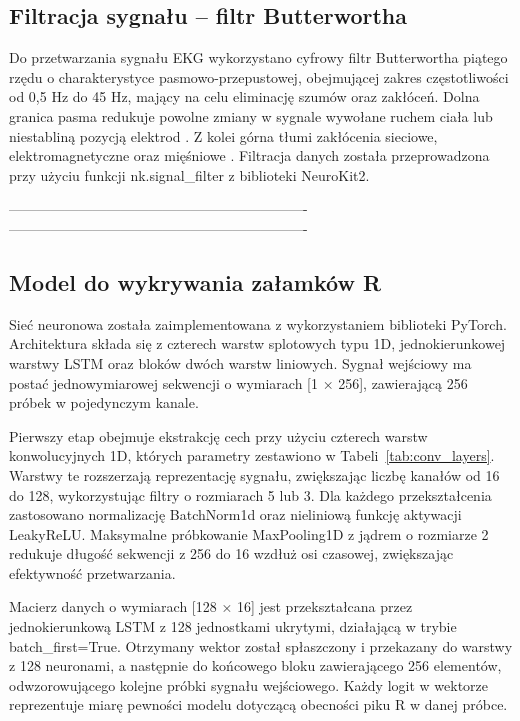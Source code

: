 \documentclass[journal]{IEEEtran}
\begin{document}
\subsection{Filtracja sygnału – filtr Butterwortha}
Do przetwarzania sygnału EKG wykorzystano cyfrowy filtr Butterwortha piątego rzędu o charakterystyce pasmowo-przepustowej, obejmującej zakres częstotliwości od 0,5 Hz do 45 Hz, mający na celu eliminację szumów oraz zakłóceń. Dolna granica pasma redukuje powolne zmiany w sygnale wywołane ruchem ciała lub niestabliną pozycją elektrod  \cite{4}. Z kolei górna tłumi zakłócenia sieciowe, elektromagnetyczne oraz mięśniowe  \cite{5}. Filtracja danych została przeprowadzona przy użyciu funkcji nk.signal\_filter z biblioteki NeuroKit2.


----------------------------------------------------------------
----------------------------------------------------------------

\newpage
\subsection{Model do wykrywania załamków R}
Sieć neuronowa została zaimplementowana z wykorzystaniem biblioteki PyTorch. Architektura składa się z czterech warstw splotowych typu 1D, jednokierunkowej warstwy LSTM oraz bloków dwóch warstw liniowych. Sygnał wejściowy ma postać jednowymiarowej sekwencji o wymiarach [1 × 256], zawierającą 256 próbek w pojedynczym kanale.

Pierwszy etap obejmuje ekstrakcję cech przy użyciu czterech warstw konwolucyjnych 1D, których parametry zestawiono w Tabeli~\ref{tab:conv_layers}. Warstwy te rozszerzają reprezentację sygnału, zwiększając liczbę kanałów od 16 do 128, wykorzystując filtry o rozmiarach 5 lub 3. Dla każdego przekształcenia zastosowano normalizację BatchNorm1d oraz nieliniową funkcję aktywacji LeakyReLU. Maksymalne próbkowanie MaxPooling1D z jądrem o rozmiarze 2 redukuje długość sekwencji z 256 do 16 wzdłuż osi czasowej, zwiększając efektywność przetwarzania.

Macierz danych o wymiarach [128 × 16] jest przekształcana przez jednokierunkową LSTM z 128 jednostkami ukrytymi, działającą w trybie batch\_first=True. Otrzymany wektor został spłaszczony i przekazany do warstwy z 128 neuronami, a następnie do końcowego bloku zawierającego 256 elementów, odwzorowującego kolejne próbki sygnału wejściowego. Każdy logit w wektorze reprezentuje miarę pewności modelu dotyczącą obecności piku R w danej próbce.
\end{document}
